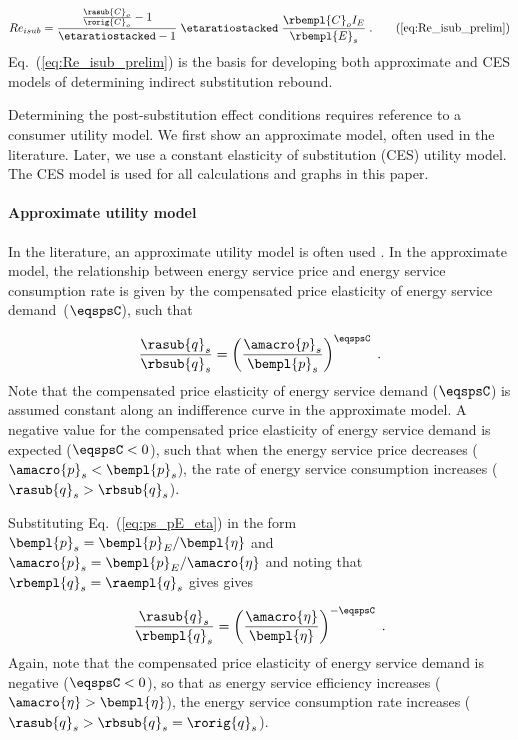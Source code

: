 \begin{equation}
  Re_{isub} = \frac{\frac{\rasub{C}_o}{\rorig{C}_o} - 1}{\etaratiostacked - 1} \; 
                          \etaratiostacked \; 
                          \frac{\rbempl{C}_o I_E}{\rbempl{E}_s} \; .
                              \tag{\ref{eq:Re_isub_prelim}}
\end{equation}
%
Eq.~(\ref{eq:Re_isub_prelim}) is the basis for
developing both approximate and CES models of determining
indirect substitution rebound.


Determining the post-substitution effect conditions
requires reference to a consumer utility model.
We first show an approximate model, often used in the literature. 
Later, we use a constant elasticity of substitution (CES)
utility model. 
The CES model is used for all calculations and graphs in this paper.


\paragraph{Approximate utility model} 
\label{sec:Resub_approximate_method}

In the literature, an approximate utility model is often used 
\citep[p.~17, footnote~43]{Borenstein:2015aa}.
In the approximate model, 
the relationship between energy service price and energy service consumption rate
is given by the compensated price elasticity of energy service demand~($\eqspsC$),
such that

\begin{equation}
  \frac{\rasub{q}_s}{\rbsub{q}_s} = \left( \frac{\amacro{p}_s}{\bempl{p}_s} \right)^{\eqspsC} \; .
\end{equation}
%
Note that the compensated price elasticity of energy service demand ($\eqspsC$)
is assumed constant along an indifference curve
in the approximate model. 
A negative value for the compensated price elasticity of energy service demand
is expected ($\eqspsC < 0$),
such that when the energy service price decreases ($\amacro{p}_s < \bempl{p}_s$),
the rate of energy service consumption increases ($\rasub{q}_s > \rbsub{q}_s$).

Substituting Eq.~(\ref{eq:ps_pE_eta}) in the form
$\bempl{p}_s = \bempl{p}_E/\bempl{\eta}$ and
$\amacro{p}_s = \bempl{p}_E/\amacro{\eta}$
and noting that $\rbempl{q}_s = \raempl{q}_s$ gives
gives

\begin{equation} \label{eq:approx_qshat_over_qsorig}
  \frac{\rasub{q}_s}{\rbempl{q}_s} = \left( \frac{\amacro{\eta}}{\bempl{\eta}} \right)^{-\eqspsC} \; .
\end{equation}
%
Again, note that the compensated price elasticity of energy service demand
is negative ($\eqspsC < 0$), so that
as energy service efficiency increases ($\amacro{\eta} > \bempl{\eta}$),
the energy service consumption rate increases ($\rasub{q}_s > \rbsub{q}_s = \rorig{q}_s$).

